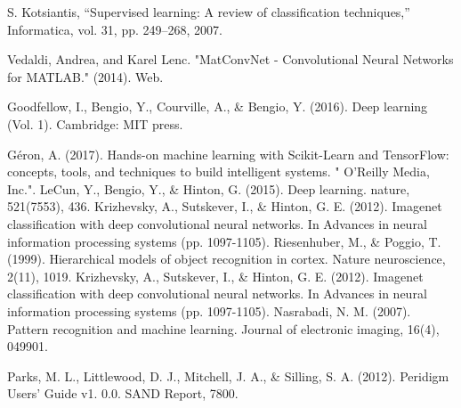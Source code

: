 \begin{thebibliography}{}
S. Kotsiantis, “Supervised learning: A review of classification techniques,” Informatica, vol. 31, pp. 249–268, 2007.

Vedaldi, Andrea, and Karel Lenc. "MatConvNet - Convolutional Neural Networks for MATLAB." (2014). Web.

Goodfellow, I., Bengio, Y., Courville, A., \& Bengio, Y. (2016). Deep learning (Vol. 1). Cambridge: MIT press.

Géron, A. (2017). Hands-on machine learning with Scikit-Learn and TensorFlow: concepts, tools, and techniques to build intelligent systems. " O'Reilly Media, Inc.".
LeCun, Y., Bengio, Y., \& Hinton, G. (2015). Deep learning. nature, 521(7553), 436.
Krizhevsky, A., Sutskever, I., \& Hinton, G. E. (2012). Imagenet classification with deep convolutional neural networks. In Advances in neural information processing systems (pp. 1097-1105).
Riesenhuber, M., \& Poggio, T. (1999). Hierarchical models of object recognition in cortex. Nature neuroscience, 2(11), 1019.
Krizhevsky, A., Sutskever, I., \& Hinton, G. E. (2012). Imagenet classification with deep convolutional neural networks. In Advances in neural information processing systems (pp. 1097-1105).
Nasrabadi, N. M. (2007). Pattern recognition and machine learning. Journal of electronic imaging, 16(4), 049901.

Parks, M. L., Littlewood, D. J., Mitchell, J. A., \& Silling, S. A. (2012). Peridigm Users’ Guide v1. 0.0. SAND Report, 7800.

\end{thebibliography}





